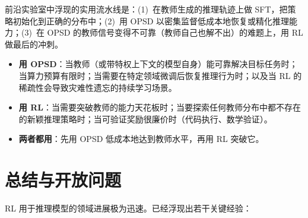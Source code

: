 前沿实验室中浮现的实用流水线是：(1)~在教师生成的推理轨迹上做 SFT，把策略初始化到正确的分布中；(2)~用 OPSD 以密集监督低成本地恢复或精化推理能力；(3)~在 OPSD 的教师信号变得不可靠（教师自己也解不出）的难题上，用 RL 做最后的冲刺。

\begin{intuitionbox}
\begin{itemize}
  \item \textbf{用 OPSD}：当教师（或带特权上下文的模型自身）能可靠解决目标任务时；当算力预算有限时；当需要在特定领域微调后恢复推理行为时；以及当 RL 的稀疏性会导致灾难性遗忘的持续学习场景。
  \item \textbf{用 RL}：当需要突破教师的能力天花板时；当要探索任何教师分布中都不存在的新颖推理策略时；当可验证奖励很廉价时（代码执行、数学验证）。
  \item \textbf{两者都用}：先用 OPSD 低成本地达到教师水平，再用 RL 突破它。
\end{itemize}
\end{intuitionbox}

\section{总结与开放问题}
\label{subsec:reasoning_summary}

RL 用于推理模型的领域进展极为迅速。已经浮现出若干关键经验：


